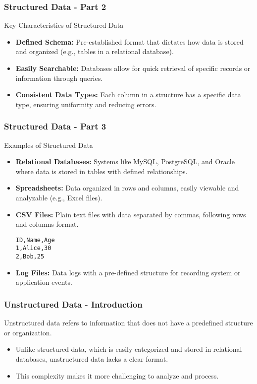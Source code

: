 \documentclass[aspectratio=169]{beamer}
\begin{document}
\begin{frame}[fragile]
    \frametitle{Structured Data - Part 2}
    \begin{block}{Key Characteristics of Structured Data}
        \begin{itemize}
            \item \textbf{Defined Schema:} Pre-established format that dictates how data is stored and organized (e.g., tables in a relational database).
            \item \textbf{Easily Searchable:} Databases allow for quick retrieval of specific records or information through queries.
            \item \textbf{Consistent Data Types:} Each column in a structure has a specific data type, ensuring uniformity and reducing errors.
        \end{itemize}
    \end{block}
\end{frame}

\begin{frame}[fragile]
    \frametitle{Structured Data - Part 3}
    \begin{block}{Examples of Structured Data}
        \begin{itemize}
            \item \textbf{Relational Databases:} 
            Systems like MySQL, PostgreSQL, and Oracle where data is stored in tables with defined relationships.
            \item \textbf{Spreadsheets:} Data organized in rows and columns, easily viewable and analyzable (e.g., Excel files).
            \item \textbf{CSV Files:} 
            Plain text files with data separated by commas, following rows and columns format.
            \begin{lstlisting}
ID,Name,Age
1,Alice,30
2,Bob,25
            \end{lstlisting}
            \item \textbf{Log Files:} Data logs with a pre-defined structure for recording system or application events.
        \end{itemize}
    \end{block}
\end{frame}

\begin{frame}[fragile]
    \frametitle{Unstructured Data - Introduction}
    Unstructured data refers to information that does not have a predefined structure or organization. 
    \begin{itemize}
        \item Unlike structured data, which is easily categorized and stored in relational databases, 
        unstructured data lacks a clear format.
        \item This complexity makes it more challenging to analyze and process.
    \end{itemize}
\end{frame}
\end{document}
